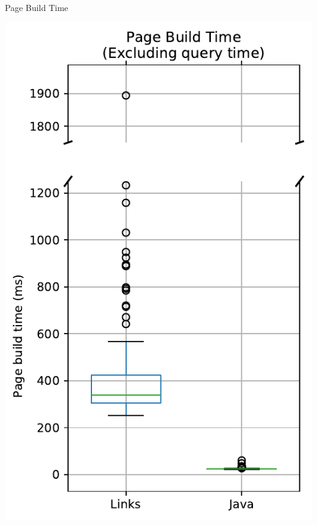 \documentclass[11.5pt, aspectratio=169]{beamer}
\begin{document}
\begin{frame}{Page Build Time}

\begin{minipage}[t]{0.48\textwidth}
    \centering
    \includegraphics[scale=0.33]{images/objectdisplay_pagebuild_excl_box.pdf}
    ~

\end{minipage}
\end{frame}
\end{document}
